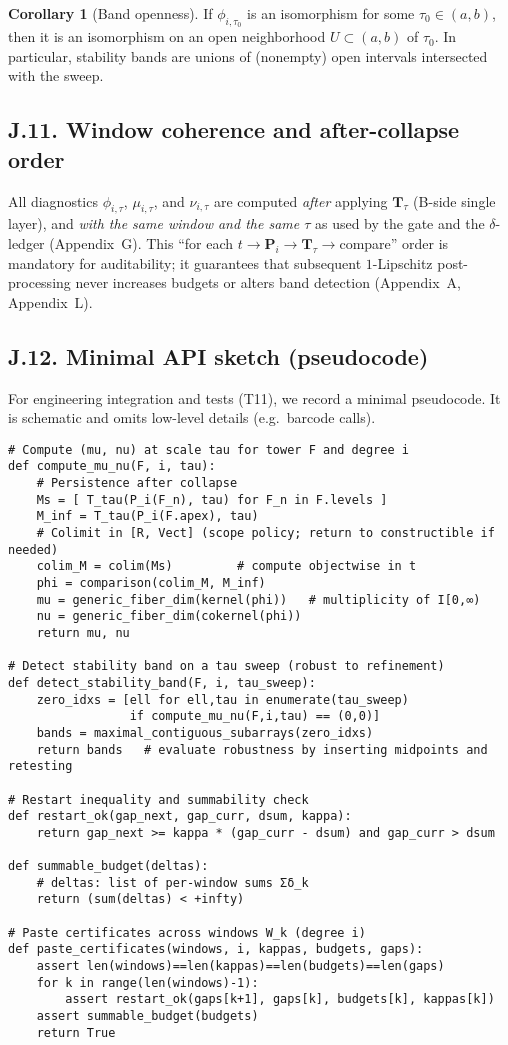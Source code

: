 \documentclass[11pt]{article}
\numberwithin{equation}{section}
\theoremstyle{plain}
\theoremstyle{definition}
\theoremstyle{remark}
\theoremstyle{plain}
\theoremstyle{definition}
\numberwithin{equation}{section}
\newtheorem{corollary}[theorem]{Corollary}
\theoremstyle{definition}
\numberwithin{equation}{section}
\theoremstyle{plain}
\theoremstyle{definition}
\theoremstyle{remark}
\begin{document}
\begin{corollary}[Band openness]\label{J:cor:band-open}
If \(\phi_{i,\tau_0}\) is an isomorphism for some \(\tau_0\in(a,b)\), then it is an isomorphism on an open neighborhood \(U\subset(a,b)\) of \(\tau_0\). In particular, stability bands are unions of (nonempty) open intervals intersected with the sweep.
\end{corollary}

\subsection*{J.11. Window coherence and after-collapse order}
All diagnostics \(\phi_{i,\tau}\), \(\mu_{i,\tau}\), and \(\nu_{i,\tau}\) are computed \emph{after} applying \(\mathbf{T}_\tau\) (B-side single layer), and \emph{with the same window and the same \(\tau\)} as used by the gate and the \(\delta\)-ledger (Appendix~G). This ``for each \(t\)\(\to\)\(\mathbf{P}_i\)\(\to\)\(\mathbf{T}_\tau\)\(\to\)compare'' order is mandatory for auditability; it guarantees that subsequent \(1\)-Lipschitz post-processing never increases budgets or alters band detection (Appendix~A, Appendix~L).

\subsection*{J.12. Minimal API sketch (pseudocode)}
For engineering integration and tests (T11), we record a minimal pseudocode. It is schematic and omits low-level details (e.g.\ barcode calls).

\begin{verbatim}
# Compute (mu, nu) at scale tau for tower F and degree i
def compute_mu_nu(F, i, tau):
    # Persistence after collapse
    Ms = [ T_tau(P_i(F_n), tau) for F_n in F.levels ]
    M_inf = T_tau(P_i(F.apex), tau)
    # Colimit in [R, Vect] (scope policy; return to constructible if needed)
    colim_M = colim(Ms)         # compute objectwise in t
    phi = comparison(colim_M, M_inf)
    mu = generic_fiber_dim(kernel(phi))   # multiplicity of I[0,∞)
    nu = generic_fiber_dim(cokernel(phi))
    return mu, nu

# Detect stability band on a tau sweep (robust to refinement)
def detect_stability_band(F, i, tau_sweep):
    zero_idxs = [ell for ell,tau in enumerate(tau_sweep)
                 if compute_mu_nu(F,i,tau) == (0,0)]
    bands = maximal_contiguous_subarrays(zero_idxs)
    return bands   # evaluate robustness by inserting midpoints and retesting

# Restart inequality and summability check
def restart_ok(gap_next, gap_curr, dsum, kappa):
    return gap_next >= kappa * (gap_curr - dsum) and gap_curr > dsum

def summable_budget(deltas):
    # deltas: list of per-window sums Σδ_k
    return (sum(deltas) < +infty)

# Paste certificates across windows W_k (degree i)
def paste_certificates(windows, i, kappas, budgets, gaps):
    assert len(windows)==len(kappas)==len(budgets)==len(gaps)
    for k in range(len(windows)-1):
        assert restart_ok(gaps[k+1], gaps[k], budgets[k], kappas[k])
    assert summable_budget(budgets)
    return True
\end{verbatim}
\end{document}

